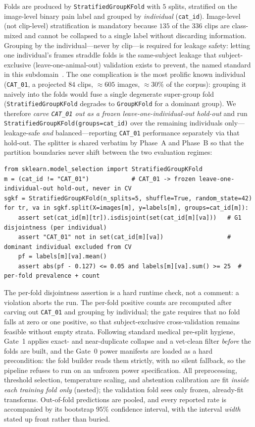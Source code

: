 Folds are produced by \texttt{StratifiedGroupKFold} with $5$ splits, stratified on the
image-level binary pain label and grouped by \emph{individual} (\texttt{cat\_id}). Image-level
(not clip-level) stratification is mandatory because $135$ of the $336$ clips are class-mixed
and cannot be collapsed to a single label without discarding information. Grouping by the
individual---never by clip---is required for leakage safety: letting one individual's frames
straddle folds is the same-subject leakage that subject-exclusive (leave-one-animal-out)
validation exists to prevent, the named standard in this subdomain~\cite{feighelstein2023}. The
one complication is the most prolific known individual (\texttt{CAT\_01}, a projected $84$ clips,
$\approx 605$ images, $\approx 30\%$ of the corpus): grouping it naively into the folds would
fuse a single degenerate super-group fold (\texttt{StratifiedGroupKFold} degrades to
\texttt{GroupKFold} for a dominant group). We therefore \emph{carve \texttt{CAT\_01} out as a
frozen leave-one-individual-out hold-out} and run \texttt{StratifiedGroupKFold(groups=cat\_id)}
over the remaining individuals only---leakage-safe \emph{and} balanced---reporting
\texttt{CAT\_01} performance separately via that hold-out. The splitter is shared verbatim by
Phase~A and Phase~B so that the partition boundaries never shift between the two evaluation
regimes:

\begin{verbatim}
from sklearn.model_selection import StratifiedGroupKFold
m = (cat_id != "CAT_01")            # CAT_01 -> frozen leave-one-individual-out hold-out, never in CV
sgkf = StratifiedGroupKFold(n_splits=5, shuffle=True, random_state=42)
for tr, va in sgkf.split(X=images[m], y=labels[m], groups=cat_id[m]):
    assert set(cat_id[m][tr]).isdisjoint(set(cat_id[m][va]))   # G1 disjointness (per individual)
    assert "CAT_01" not in set(cat_id[m][va])                  # dominant individual excluded from CV
    pf = labels[m][va].mean()
    assert abs(pf - 0.127) <= 0.05 and labels[m][va].sum() >= 25  # per-fold prevalence + count
\end{verbatim}

The per-fold disjointness assertion is a hard runtime check, not a comment: a violation aborts
the run. The per-fold positive counts are recomputed after carving out \texttt{CAT\_01} and
grouping by individual; the gate requires that no fold falls at zero or one positive, so that
subject-exclusive cross-validation remains feasible without empty strata. Following standard
medical pre-split hygiene, Gate~1 applies exact- and near-duplicate collapse and a
vet-clean filter \emph{before} the folds are built, and the Gate~0 power manifests are loaded
as a hard precondition: the fold builder reads them strictly, with no silent fallback, so the
pipeline refuses to run on an unfrozen power specification. All preprocessing, threshold
selection, temperature scaling, and abstention calibration
are fit \emph{inside each training fold only} (nested); the validation fold sees only frozen,
already-fit transforms. Out-of-fold predictions are pooled, and every reported rate is
accompanied by its bootstrap $95\%$ confidence interval, with the interval \emph{width} stated
up front rather than buried.


